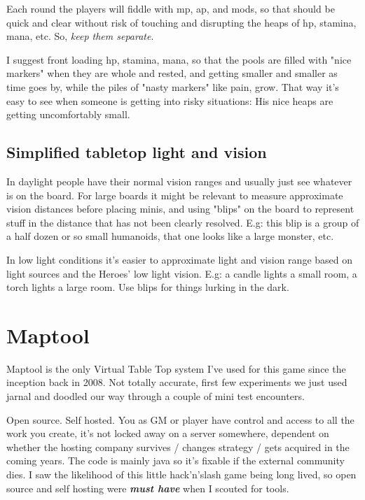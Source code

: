 Each round the players will fiddle with mp, ap, and mods, so that should be quick and clear without risk of touching and disrupting the heaps of hp, stamina, mana, etc. So, \emph{keep them separate}.

I suggest front loading hp, stamina, mana, so that the pools are filled with "nice markers" when they are whole and rested, and getting smaller and smaller as time goes by, while the piles of "nasty markers" like pain, grow. That way it's easy to see when someone is getting into risky situations: His nice heaps are getting uncomfortably small.


\subsection*{Simplified tabletop light and vision}
In daylight people have their normal vision ranges and usually just see whatever is on the board. For large boards it might be relevant to measure approximate vision distances before placing minis, and using "blips" on the board to represent stuff in the distance that has not been clearly resolved. E.g: this blip is a group of a half dozen or so small humanoids, that one looks like a large monster, etc.

In low light conditions it's easier to approximate light and vision range based on light sources and the Heroes' low light vision. E.g: a candle lights a small room, a torch lights a large room. Use blips for things lurking in the dark.







\section*{Maptool}
Maptool is the only Virtual Table Top system I've used for this game since the inception back in 2008. Not totally accurate, first few experiments we just used jarnal and doodled our way through a couple of mini test encounters.

Open source. Self hosted. You as GM or player have control and access to all the work you create, it's not locked away on a server somewhere, dependent on whether the hosting company survives / changes strategy / gets acquired in the coming years. The code is mainly java so it's fixable if the external community dies. I saw the likelihood of this little hack'n'slash game being long lived, so open source and self hosting were \textit{\textbf{must have}} when I scouted for tools.

